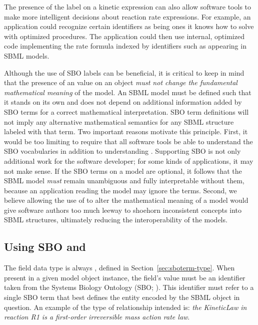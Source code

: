 The presence of the label on a kinetic expression can also allow
software tools to make more intelligent decisions about reaction
rate expressions.  For example, an application could recognize
certain identifiers as being ones it knows how to solve with
optimized procedures.  The application could then use internal,
optimized code implementing the rate formula indexed by
identifiers such as  appearing in SBML models.

Although the use of SBO labels can be beneficial, it is critical
to keep in mind that the presence of an  value on
an object \emph{must not change the fundamental mathematical
  meaning} of the model.  An SBML model must be defined such that
it stands on its own and does not depend on additional information
added by SBO terms for a correct mathematical interpretation.  SBO
term definitions will not imply any alternative mathematical
semantics for any SBML structure labeled with that term.  Two
important reasons motivate this principle.  First, it would be too
limiting to require that all software tools be able to understand
the SBO vocabularies in addition to understanding \sbmltwotwo.
Supporting SBO is not only additional work for the software
developer; for some kinds of applications, it may not make sense.
If the SBO terms on a model are optional, it follows that the SBML
model \emph{must} remain unambiguous and fully interpretable
without them, because an application reading the model may ignore
the terms.  Second, we believe allowing the use of 
to alter the mathematical meaning of a model would give software
authors too much leeway to shoehorn inconsistent concepts into
SBML structures, ultimately reducing the interoperability of the
models.


\subsection{Using SBO and }

The  field data type is always ,
defined in Section~\ref{sec:sboterm-type}.  When present in a
given model object instance, the field's value must be an
identifier taken from the Systems Biology Ontology (SBO; \sboref).
This identifier must refer to a single SBO term that best defines
the entity encoded by the SBML object in question.  An example of
the type of relationship intended is: \emph{the KineticLaw in
  reaction R1 is a first-order irreversible mass action rate law}.

